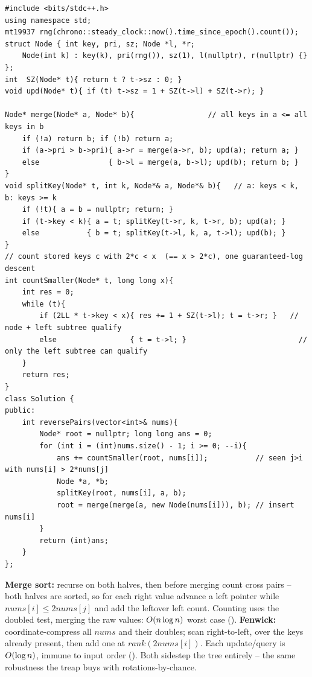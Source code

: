 \begin{lstlisting}[caption={Reverse Pairs -- keyed, size-augmented treap with a 2x-threshold rank (LeetCode 493; O(n log n) expected)}, label={lst:c06-summit}]
#include <bits/stdc++.h>
using namespace std;
mt19937 rng(chrono::steady_clock::now().time_since_epoch().count());
struct Node { int key, pri, sz; Node *l, *r;
    Node(int k) : key(k), pri(rng()), sz(1), l(nullptr), r(nullptr) {} };
int  SZ(Node* t){ return t ? t->sz : 0; }
void upd(Node* t){ if (t) t->sz = 1 + SZ(t->l) + SZ(t->r); }

Node* merge(Node* a, Node* b){                 // all keys in a <= all keys in b
    if (!a) return b; if (!b) return a;
    if (a->pri > b->pri){ a->r = merge(a->r, b); upd(a); return a; }
    else                { b->l = merge(a, b->l); upd(b); return b; }
}
void splitKey(Node* t, int k, Node*& a, Node*& b){   // a: keys < k, b: keys >= k
    if (!t){ a = b = nullptr; return; }
    if (t->key < k){ a = t; splitKey(t->r, k, t->r, b); upd(a); }
    else           { b = t; splitKey(t->l, k, a, t->l); upd(b); }
}
// count stored keys c with 2*c < x  (== x > 2*c), one guaranteed-log descent
int countSmaller(Node* t, long long x){
    int res = 0;
    while (t){
        if (2LL * t->key < x){ res += 1 + SZ(t->l); t = t->r; }   // node + left subtree qualify
        else                 { t = t->l; }                          // only the left subtree can qualify
    }
    return res;
}
class Solution {
public:
    int reversePairs(vector<int>& nums){
        Node* root = nullptr; long long ans = 0;
        for (int i = (int)nums.size() - 1; i >= 0; --i){
            ans += countSmaller(root, nums[i]);           // seen j>i with nums[i] > 2*nums[j]
            Node *a, *b;
            splitKey(root, nums[i], a, b);
            root = merge(merge(a, new Node(nums[i])), b); // insert nums[i]
        }
        return (int)ans;
    }
};
\end{lstlisting}
\begin{notebox}
\textbf{Merge sort:} recurse on both halves, then before merging count cross pairs -- both halves are
sorted, so for each right value advance a left pointer while $\mathit{nums}[i]\le 2\mathit{nums}[j]$ and add
the leftover left count. Counting uses the doubled test, merging the raw values: $O(n\log n)$ worst case
(). \textbf{Fenwick:} coordinate-compress all $\mathit{nums}$ and their doubles; scan
right-to-left,  over the keys already present, then add one at
$\mathit{rank}(2\mathit{nums}[i])$. Each update/query is $O(\log n)$, immune to input order
(). Both sidestep the tree entirely -- the same robustness the treap buys with rotations-by-chance.
\end{notebox}

